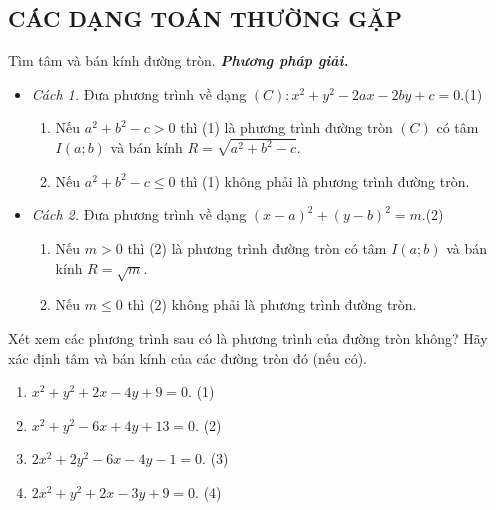 \subsection{CÁC DẠNG TOÁN THƯỜNG GẶP}
\begin{dang}{Tìm tâm và bán kính đường tròn.}
	\textbf{\textit{Phương pháp giải.}}
	\begin{itemize}
		\item \textit{Cách 1.} Đưa phương trình về dạng $(C)\colon x^2+y^2-2ax-2by+c=0$.\qquad (1) 
		\begin{enumerate}[-]
			\item Nếu $a^2+b^2-c>0$ thì (1) là phương trình đường tròn $(C)$ có tâm $I\left(a;b\right)$ và bán kính $R=\sqrt{a^2+b^2-c}$.
			\item Nếu $a^2+b^2-c\le 0$ thì (1) không phải là phương trình đường tròn.
		\end{enumerate}
		\item \textit{Cách 2.} Đưa phương trình về dạng $(x-a)^2+(y-b)^2=m$.\qquad (2)
		\begin{enumerate}[-]
			\item Nếu $m > 0$ thì (2) là phương trình đường tròn có tâm $I\left(a;b\right)$ và bán kính $R=\sqrt{m}$.
			\item Nếu $m\le 0$ thì (2) không phải là phương trình đường tròn.
		\end{enumerate}
	\end{itemize}
\end{dang}
\begin{vd}%
	Xét xem các phương trình sau có là phương trình của đường tròn không? Hãy xác định tâm và bán kính của các đường tròn đó (nếu có).
	\begin{enumerate}
		\item $x^2+y^2+2x-4y+9=0$. \qquad(1)
		\item $x^2+y^2-6x+4y+13=0$. \qquad(2)
		\item $2x^2+2y^2-6x-4y-1=0$. \qquad(3)
		\item $2x^2+y^2+2x-3y+9=0$. \qquad(4)
	\end{enumerate}
\end{vd}
